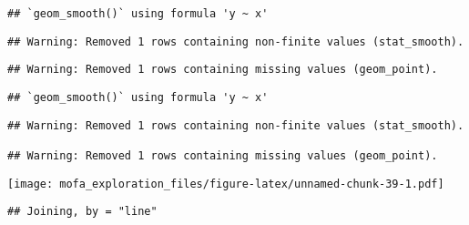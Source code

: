 \documentclass[
]{article}
\newenvironment{Shaded}{\begin{snugshade}}{\end{snugshade}}
\newcommand{\DataTypeTok}[1]{\textcolor[rgb]{0.13,0.29,0.53}{#1}}
\newcommand{\DecValTok}[1]{\textcolor[rgb]{0.00,0.00,0.81}{#1}}
\newcommand{\KeywordTok}[1]{\textcolor[rgb]{0.13,0.29,0.53}{\textbf{#1}}}
\newcommand{\NormalTok}[1]{#1}
\newcommand{\OperatorTok}[1]{\textcolor[rgb]{0.81,0.36,0.00}{\textbf{#1}}}
\newcommand{\StringTok}[1]{\textcolor[rgb]{0.31,0.60,0.02}{#1}}
\begin{document}
\begin{verbatim}
## `geom_smooth()` using formula 'y ~ x'
\end{verbatim}

\begin{verbatim}
## Warning: Removed 1 rows containing non-finite values (stat_smooth).
\end{verbatim}

\begin{verbatim}
## Warning: Removed 1 rows containing missing values (geom_point).
\end{verbatim}

\begin{verbatim}
## `geom_smooth()` using formula 'y ~ x'
\end{verbatim}

\begin{verbatim}
## Warning: Removed 1 rows containing non-finite values (stat_smooth).

## Warning: Removed 1 rows containing missing values (geom_point).
\end{verbatim}

\texttt{[image: mofa\_exploration\_files/figure-latex/unnamed-chunk-39-1.pdf]}

\begin{Shaded}
\end{Shaded}

\begin{verbatim}
## Joining, by = "line"
\end{verbatim}
\end{document}
